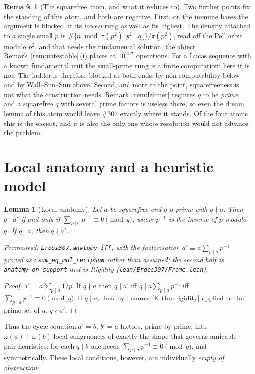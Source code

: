 \documentclass[11pt]{article}
\newtheorem{lemma}[theorem]{Lemma}
\theoremstyle{definition}
\newtheorem{remark}[theorem]{Remark}
\begin{document}
\begin{remark}[The squarefree atom, and what it reduces to]
Two further points fix the standing of this atom, and both are negative. First, on the immune bases
the argument is blocked at its \emph{lowest} rung as well as its highest. The density attached to a
single small $p$ is $\#\{n\bmod\pi(p^2):p^2\mid q_n\}/\pi(p^2)$, read off the Pell orbit modulo
$p^2$, and that needs the fundamental solution, the object Remark~\ref{rem:untestable}\,(i) places
at $10^{24.7}$ operations. For a Lucas sequence with a known fundamental unit the small-prime rung is
a finite computation; here it is not. The ladder is therefore blocked at both ends, by
non-computability below and by Wall--Sun--Sun above. Second, and more to the point, squarefreeness is
not what the construction needs: Remark~\ref{rem:lehmer} requires $q$ to be \emph{prime}, and a
squarefree $q$ with several prime factors is useless there, so even the dream lemma of this atom
would leave \#307 exactly where it stands. Of the four atoms this is the easiest, and it is also the
only one whose resolution would not advance the problem.
\end{remark}

\section{Local anatomy and a heuristic model}\label{sec:anatomy}

\begin{lemma}[Local anatomy]\label{lem:anatomy}
Let $a$ be squarefree and $q$ a prime with $q\nmid a$. Then $q\mid a'$ if and only if
$\sum_{p\mid a}p^{-1}\equiv 0\pmod q$, where $p^{-1}$ is the inverse of $p$ modulo $q$. If $q\mid a$,
then $q\nmid a'$.

\textup{Formalised.} \texttt{Erdos307.anatomy\_iff}, with the factorisation
$a'\equiv a\sum_{p\mid a}p^{-1}$ proved as \texttt{csum\_eq\_mul\_recipSum} rather than assumed; the
second half is \texttt{anatomy\_on\_support} and is Rigidity
\textup{(\texttt{lean/Erdos307/Frame.lean})}.
\end{lemma}
\begin{proof}
$a'=a\sum_{p\mid a}1/p$. If $q\nmid a$ then $q\mid a'$ iff $q\mid a\sum_{p\mid a}p^{-1}$ iff
$\sum_{p\mid a}p^{-1}\equiv0\pmod q$. If $q\mid a$, then by Lemma~\ref{K-thm:rigidity}
applied to the prime set of $a$, $q\nmid a'$.
\end{proof}

Thus the cycle equation $a'=b$, $b'=a$ factors, prime by prime, into
$\omega(a)+\omega(b)$ local congruences of exactly the shape that governs amicable--pair heuristics:
for each $q\mid b$ one needs $\sum_{p\mid a}p^{-1}\equiv0\pmod q$, and symmetrically. These local
conditions, however, are individually \emph{empty of obstruction}:
\end{document}
